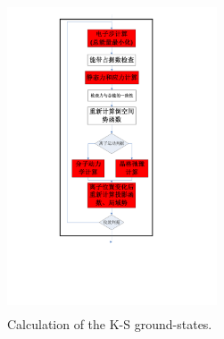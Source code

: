 \documentclass[cjk,slidestop,compress,mathserif,blue]{beamer}
\begin{document}
\frame
{
\frametitle{}
\begin{figure}[h!]
\centering
\vspace*{-0.65in}
\includegraphics[height=3.62in,width=2.45in,viewport=146 173 416 812,clip]{Figures/VASP_main_Flow-3.pdf}
\caption{\tiny \textrm{Calculation of the K-S ground-states.}}%
\label{VASP_Follow-3}
\end{figure}
}
\end{document}
